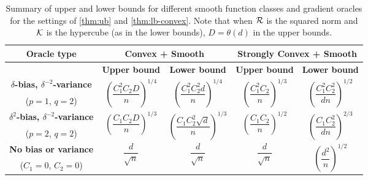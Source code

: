 \begin{table*}
\small
\centering
 \caption{Summary of upper and lower bounds for different smooth function classes and  gradient oracles for the settings of \cref{thm:ub} and \cref{thm:lb-convex}. Note that when $\mathcal{R}$ is the squared norm and $\mathcal{K}$ is the hypercube (as in the lower bounds), $D=\theta(d)$ in the upper bounds.}
\label{tab:mse-1}
 \begin{tabular}{|c|c|c|c|c|}
\toprule
  \multirow{2}{*}{\textbf{Oracle type}} & \multicolumn{2}{c}{\multirow{2}{*}{\textbf{Convex + Smooth}}} & \multicolumn{2}{|c|}{\multirow{2}{*}{\textbf{Strongly Convex + Smooth}}} \\[1em]
 \midrule
 & \textbf{Upper bound} & \textbf{Lower bound} & \textbf{Upper bound} & \textbf{Lower bound}\\
 \midrule
\textbf{ $\delta$-bias, $\delta^{-2}$-variance} & \multirow{2}{*}{$\left(\dfrac{C_1^{2}C_2 D}{n}\right)^{1/4}$}  & \multirow{2}{*}{$\left(\dfrac{C_1^2 C_2^2 d}{n}\right)^{1/4}$}& \multirow{2}{*}{$\left(\dfrac{C_1^2 C_2}{n}\right)^{1/3}$}  & \multirow{2}{*}{$\left(\dfrac{C_1^2 C_2^2}{d n}\right)^{1/2}$} \\[0.5ex]
 ($p=1$, $q=2$) & & & &\\\midrule
\textbf{$\delta^2$-bias, $\delta^{-2}$-variance } & \multirow{2}{*}{$\left(\dfrac{C_1 C_2 D}{n}\right)^{1/3}$}  & \multirow{2}{*}{$\left(\dfrac{C_1 C_2^2 \sqrt d}{n}\right)^{1/3}$} & \multirow{2}{*}{$\left(\dfrac{C_1 C_2}{n}\right)^{1/2}$}  & \multirow{2}{*}{$\left(\dfrac{C_1 C_2^2 }{d n}\right)^{2/3}$}\\[1.4ex]
 ($p=2$, $q=2$) & & & &\\
  \midrule
 \textbf{No bias or variance} & \multirow{2}{*}{$\dfrac{d}{\sqrt{n}}$}  & \multirow{2}{*}{$\dfrac{d}{\sqrt{n}}$} & \multirow{2}{*}{$\dfrac{d}{\sqrt{n}}$}  & \multirow{2}{*}{$\left(\dfrac{d^2}{n}\right)^{1/2}$}  \\[0.5ex]
 ($C_1=0$, $C_2=0$) & & & &\\\bottomrule
\end{tabular}
\end{table*}


